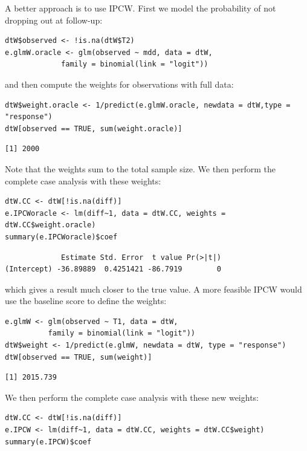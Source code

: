 \documentclass[12pt]{article}
\begin{document}
\clearpage

 A better approach is to use IPCW. First we model the probability of
not dropping out at follow-up:
\lstset{language=r,label= ,caption= ,captionpos=b,numbers=none}
\begin{lstlisting}
dtW$observed <- !is.na(dtW$T2)
e.glmW.oracle <- glm(observed ~ mdd, data = dtW,
		     family = binomial(link = "logit"))
\end{lstlisting}

and then compute the weights for observations with full data:
\lstset{language=r,label= ,caption= ,captionpos=b,numbers=none}
\begin{lstlisting}
dtW$weight.oracle <- 1/predict(e.glmW.oracle, newdata = dtW,type = "response")
dtW[observed == TRUE, sum(weight.oracle)]
\end{lstlisting}

\begin{verbatim}
[1] 2000
\end{verbatim}


Note that the weights sum to the total sample size. We then perform
the complete case analysis with these weights:
\lstset{language=r,label= ,caption= ,captionpos=b,numbers=none}
\begin{lstlisting}
dtW.CC <- dtW[!is.na(diff)]
e.IPCWoracle <- lm(diff~1, data = dtW.CC, weights = dtW.CC$weight.oracle)
summary(e.IPCWoracle)$coef
\end{lstlisting}

\begin{verbatim}
             Estimate Std. Error  t value Pr(>|t|)
(Intercept) -36.89889  0.4251421 -86.7919        0
\end{verbatim}


which gives a result much closer to the true value. A more feasible
IPCW would use the baseline score to define the weights:
\lstset{language=r,label= ,caption= ,captionpos=b,numbers=none}
\begin{lstlisting}
e.glmW <- glm(observed ~ T1, data = dtW,
	      family = binomial(link = "logit"))
dtW$weight <- 1/predict(e.glmW, newdata = dtW, type = "response")
dtW[observed == TRUE, sum(weight)]
\end{lstlisting}

\begin{verbatim}
[1] 2015.739
\end{verbatim}


We then perform the complete case analysis with these new weights:
\lstset{language=r,label= ,caption= ,captionpos=b,numbers=none}
\begin{lstlisting}
dtW.CC <- dtW[!is.na(diff)]
e.IPCW <- lm(diff~1, data = dtW.CC, weights = dtW.CC$weight)
summary(e.IPCW)$coef
\end{lstlisting}
\end{document}
